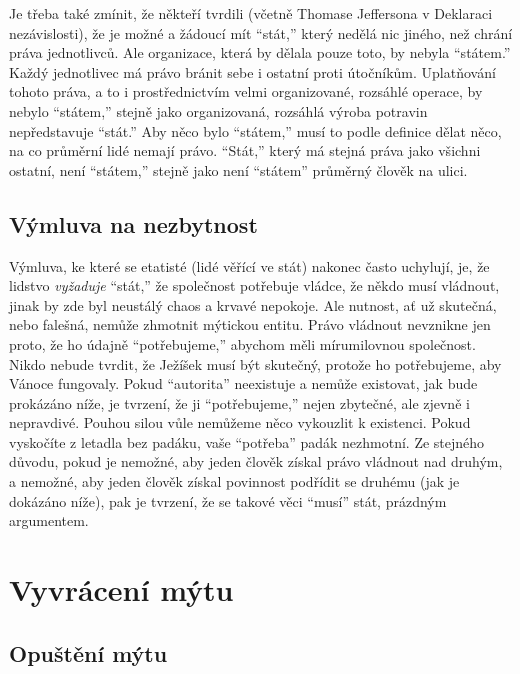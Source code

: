 \documentclass{book}
\begin{document}
Je třeba také zmínit, že někteří tvrdili (včetně Thomase Jeffersona v Deklaraci nezávislosti), že je možné a žádoucí mít \enquote{stát,} který nedělá nic jiného, než chrání práva jednotlivců. Ale organizace, která by dělala pouze toto, by nebyla \enquote{státem.} Každý jednotlivec má právo bránit sebe i ostatní proti útočníkům. Uplatňování tohoto práva, a to i prostřednictvím velmi organizované, rozsáhlé operace, by nebylo \enquote{státem,} stejně jako organizovaná, rozsáhlá výroba potravin nepředstavuje \enquote{stát.} Aby něco bylo \enquote{státem,} musí to podle definice dělat něco, na co průměrní lidé nemají právo. \enquote{Stát,} který má stejná práva jako všichni ostatní, není \enquote{státem,} stejně jako není \enquote{státem} průměrný člověk na ulici.

\section{Výmluva na nezbytnost}

Výmluva, ke které se etatisté (lidé věřící ve stát) nakonec často uchylují, je, že lidstvo \emph{vyžaduje} \enquote{stát,} že společnost potřebuje vládce, že někdo musí vládnout, jinak by zde byl neustálý chaos a krvavé nepokoje. Ale nutnost, ať už skutečná, nebo falešná, nemůže zhmotnit mýtickou entitu. Právo vládnout nevznikne jen proto, že ho údajně \enquote{potřebujeme,} abychom měli mírumilovnou společnost. Nikdo nebude tvrdit, že Ježíšek musí být skutečný, protože ho potřebujeme, aby Vánoce fungovaly. Pokud \enquote{autorita} neexistuje a nemůže existovat, jak bude prokázáno níže, je tvrzení, že ji \enquote{potřebujeme,} nejen zbytečné, ale zjevně i nepravdivé. Pouhou silou vůle nemůžeme něco vykouzlit k existenci. Pokud vyskočíte z letadla bez padáku, vaše \enquote{potřeba} padák nezhmotní. Ze stejného důvodu, pokud je nemožné, aby jeden člověk získal právo vládnout nad druhým, a nemožné, aby jeden člověk získal povinnost podřídit se druhému (jak je dokázáno níže), pak je tvrzení, že se takové věci \enquote{musí} stát, prázdným argumentem.

\chapter{Vyvrácení mýtu}

\section{Opuštění mýtu}
\end{document}
